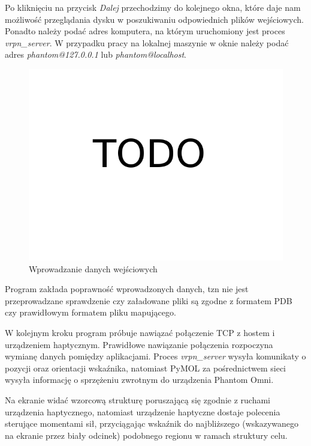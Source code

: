 \documentclass[licencjacka]{pracamgr}
\begin{document}
Po kliknięciu na przycisk \textit{Dalej} przechodzimy do kolejnego okna, które daje nam możliwość przeglądania dysku w poszukiwaniu odpowiednich plików wejściowych. Ponadto należy podać adres komputera, na którym uruchomiony jest proces \textit{vrpn\_server}. W przypadku pracy na lokalnej maszynie w oknie należy podać adres \textit{phantom@127.0.0.1} lub \textit{phantom@localhost}.

\begin{figure}[H]
\centering
\includegraphics[scale=0.3,center]{todo}
\caption{Wprowadzanie danych wejściowych}
\end{figure}

Program zakłada poprawność wprowadzonych danych, tzn nie jest przeprowadzane sprawdzenie czy załadowane pliki są zgodne z formatem PDB czy prawidłowym formatem pliku mapującego.

W kolejnym kroku program próbuje nawiązać połączenie TCP z hostem i urządzeniem haptycznym. Prawidłowe nawiązanie połączenia rozpoczyna wymianę danych pomiędzy aplikacjami. Proces \textit{vrpn\_server} wysyła komunikaty o pozycji oraz orientacji wskaźnika, natomiast PyMOL za pośrednictwem sieci wysyła informację o sprzężeniu zwrotnym do urządzenia Phantom Omni. 

Na ekranie widać wzorcową strukturę poruszającą się zgodnie z ruchami urządzenia haptycznego, natomiast urządzenie haptyczne dostaje polecenia sterujące momentami sił, przyciągając wskaźnik do najbliższego (wskazywanego na ekranie przez biały odcinek) podobnego regionu w ramach struktury celu.
\end{document}
